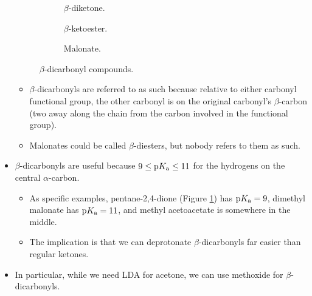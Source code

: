 \documentclass[../notes.tex]{subfiles}
\begin{document}
\begin{itemize}
    \begin{figure}[h!]
        \centering
        \footnotesize
        \begin{subfigure}[b]{0.25\linewidth}
            \centering
            \caption{$\beta$-diketone.}
            \label{fig:betaDicarbonylsa}
        \end{subfigure}
        \begin{subfigure}[b]{0.25\linewidth}
            \centering
            \caption{$\beta$-ketoester.}
            \label{fig:betaDicarbonylsb}
        \end{subfigure}
        \begin{subfigure}[b]{0.25\linewidth}
            \centering
            \caption{Malonate.}
            \label{fig:betaDicarbonylsc}
        \end{subfigure}
        \caption{$\beta$-dicarbonyl compounds.}
        \label{fig:betaDicarbonyls}
    \end{figure}
    \begin{itemize}
        \item $\beta$-dicarbonyls are referred to as such because relative to either carbonyl functional group, the other carbonyl is on the original carbonyl's $\beta$-carbon (two away along the chain from the carbon involved in the functional group).
        \item Malonates could be called $\beta$-diesters, but nobody refers to them as such.
    \end{itemize}
    \item $\beta$-dicarbonyls are useful because $9\leq\text{p}K_\text{a}\leq 11$ for the hydrogens on the central $\alpha$-carbon.
    \begin{itemize}
        \item As specific examples, pentane-2,4-dione (Figure \ref{fig:betaDicarbonylsa}) has $\text{p}K_\text{a}=9$, dimethyl malonate has $\text{p}K_\text{a}=11$, and methyl acetoacetate is somewhere in the middle.
        \item The implication is that we can deprotonate $\beta$-dicarbonyls far easier than regular ketones.
    \end{itemize}
    \item In particular, while we need LDA for acetone, we can use methoxide for $\beta$-dicarbonyls.
    \begin{figure}[h!]
        \centering

\end{figure}
\end{itemize}
\end{document}
